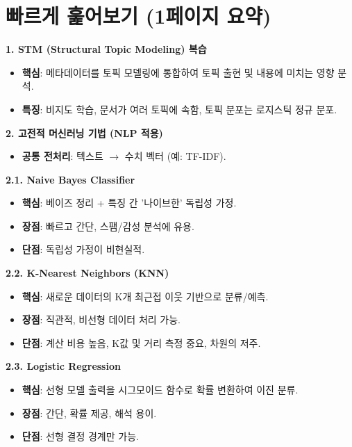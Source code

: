 \documentclass[11pt,a4paper]{article}
\begin{document}
\newpage
\section*{빠르게 훑어보기 (1페이지 요약)}

\begin{tcolorbox}[title=\textbf{CSCI89 Lecture 9: 고전적 머신러닝 핵심 요약}, colback=myblue!10, colframe=blue!75!black, boxrule=0.8pt, arc=4pt]
\textbf{1. STM (Structural Topic Modeling) 복습}
\begin{itemize}
    \item \textbf{핵심}: 메타데이터를 토픽 모델링에 통합하여 토픽 출현 및 내용에 미치는 영향 분석.
    \item \textbf{특징}: 비지도 학습, 문서가 여러 토픽에 속함, 토픽 분포는 로지스틱 정규 분포.
\end{itemize}

\textbf{2. 고전적 머신러닝 기법 (NLP 적용)}
\begin{itemize}
    \item \textbf{공통 전처리}: 텍스트 $\rightarrow$ 수치 벡터 (예: TF-IDF).
\end{itemize}

\textbf{2.1. Naive Bayes Classifier}
\begin{itemize}
    \item \textbf{핵심}: 베이즈 정리 + 특징 간 '나이브한' 독립성 가정.
    \item \textbf{장점}: 빠르고 간단, 스팸/감성 분석에 유용.
    \item \textbf{단점}: 독립성 가정이 비현실적.
\end{itemize}

\textbf{2.2. K-Nearest Neighbors (KNN)}
\begin{itemize}
    \item \textbf{핵심}: 새로운 데이터의 K개 최근접 이웃 기반으로 분류/예측.
    \item \textbf{장점}: 직관적, 비선형 데이터 처리 가능.
    \item \textbf{단점}: 계산 비용 높음, K값 및 거리 측정 중요, 차원의 저주.
\end{itemize}

\textbf{2.3. Logistic Regression}
\begin{itemize}
    \item \textbf{핵심}: 선형 모델 출력을 시그모이드 함수로 확률 변환하여 이진 분류.
    \item \textbf{장점}: 간단, 확률 제공, 해석 용이.
    \item \textbf{단점}: 선형 결정 경계만 가능.
\end{itemize}


\end{tcolorbox}
\end{document}

